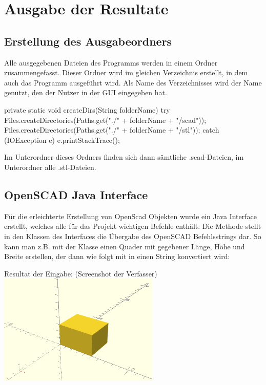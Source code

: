 \section{Ausgabe der Resultate}
\subsection{Erstellung des Ausgabeordners}
Alle ausgegebenen Dateien des Programms werden in einem Ordner zusammengefasst.
Dieser Ordner wird im gleichen Verzeichnis erstellt, in dem auch das Programm ausgeführt wird.
Als Name des Verzeichnisses wird der Name genutzt, den der Nutzer in der GUI eingegeben hat.
 
\begin{code}
	private static void createDirs(String folderName) {
		try {
			Files.createDirectories(Paths.get("./" + folderName + "/scad"));
			Files.createDirectories(Paths.get("./" + folderName + "/stl"));
		} catch (IOException e) {
			e.printStackTrace();
		}
	}
\end{code}

Im Unterordner  dieses Ordners finden sich dann sämtliche .scad-Dateien, im Unterordner  alle .stl-Dateien.

\subsection{OpenSCAD Java Interface}
Für die erleichterte Erstellung von OpenScad Objekten wurde ein Java Interface  erstellt, welches alle für das Projekt wichtigen Befehle enthält.
Die Methode  stellt in den Klassen des Interfaces die Übergabe des OpenSCAD Befehlsstrings dar.
So kann man z.B. mit der Klasse  einen Quader mit gegebener Länge, Höhe und Breite erstellen, der dann wie folgt mit  in einen String konvertiert wird:
\\

\begin{Bild}{Resultat der Eingabe:  (Screenshot der Verfasser)}
	\includegraphics[height = 200px]{Bilder/Quader}
\end{Bild}

